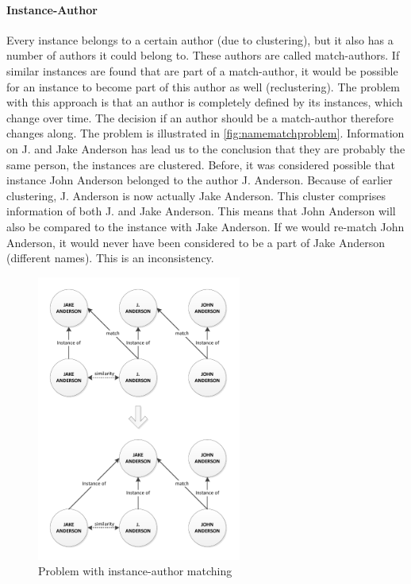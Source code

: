 \paragraph{Instance-Author} Every instance belongs to a certain author (due to clustering), but it also has a number of authors it could belong to. These authors are called match-authors. If similar instances are found that are part of a match-author, it would be possible for an instance to become part of this author as well (reclustering). The problem with this approach is that an author is completely defined by its instances, which change over time. The decision if an author should be a match-author therefore changes along. The problem is illustrated in \autoref{fig:namematchproblem}. Information on J. and Jake Anderson has lead us to the conclusion that they are probably the same person, the instances are clustered. Before, it was considered possible that instance John Anderson belonged to the author J. Anderson. Because of earlier clustering, J. Anderson is now actually Jake Anderson. This cluster comprises information of both J. and Jake Anderson. This means that John Anderson will also be compared to the instance with Jake Anderson. If we would re-match John Anderson, it would never have been considered to be a part of Jake Anderson (different names). This is an inconsistency.

\begin{figure}[htb]
	\centering
		\includegraphics[width=0.6\textwidth]{fig/namematchproblem}
	\caption{Problem with instance-author matching}
	\label{fig:namematchproblem}
\end{figure}

